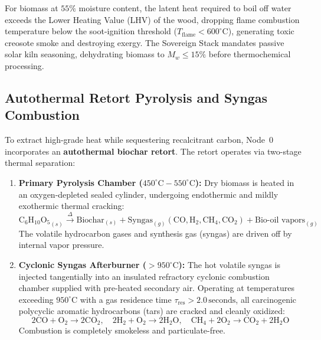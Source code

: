 For biomass at $55\%$ moisture content, the latent heat required to boil off water exceeds the Lower Heating Value (LHV) of the wood, dropping flame combustion temperature below the soot-ignition threshold ($T_{\mathrm{flame}} < 600^\circ\mathrm{C}$), generating toxic creosote smoke and destroying exergy. The Sovereign Stack mandates passive solar kiln seasoning, dehydrating biomass to $M_w \le 15\%$ before thermochemical processing.

\subsection{Autothermal Retort Pyrolysis and Syngas Combustion}
To extract high-grade heat while sequestering recalcitrant carbon, Node~0 incorporates an \textbf{autothermal biochar retort}. The retort operates via two-stage thermal separation:
\begin{enumerate}
    \item \textbf{Primary Pyrolysis Chamber ($450^\circ\mathrm{C}-550^\circ\mathrm{C}$):} Dry biomass is heated in an oxygen-depleted sealed cylinder, undergoing endothermic and mildly exothermic thermal cracking:
    \begin{equation}
    \mathrm{C_6H_{10}O_5}_{(s)} \xrightarrow{\Delta} \text{Biochar}_{(s)} + \text{Syngas}_{(g)} \left(\mathrm{CO}, \mathrm{H_2}, \mathrm{CH_4}, \mathrm{CO_2}\right) + \text{Bio-oil vapors}_{(g)}
    \label{eq:pyrolysis_stoichiometry}
    \end{equation}
    The volatile hydrocarbon gases and synthesis gas (syngas) are driven off by internal vapor pressure.
    
    \item \textbf{Cyclonic Syngas Afterburner ($>950^\circ\mathrm{C}$):} The hot volatile syngas is injected tangentially into an insulated refractory cyclonic combustion chamber supplied with pre-heated secondary air. Operating at temperatures exceeding $950^\circ\mathrm{C}$ with a gas residence time $\tau_{\mathrm{res}} > 2.0\,\mathrm{seconds}$, all carcinogenic polycyclic aromatic hydrocarbons (tars) are cracked and cleanly oxidized:
    \begin{equation}
    2\mathrm{CO} + \mathrm{O_2} \to 2\mathrm{CO_2}, \quad 2\mathrm{H_2} + \mathrm{O_2} \to 2\mathrm{H_2O}, \quad \mathrm{CH_4} + 2\mathrm{O_2} \to \mathrm{CO_2} + 2\mathrm{H_2O}
    \label{eq:syngas_combustion_rxns}
    \end{equation}
    Combustion is completely smokeless and particulate-free.
\end{enumerate}

